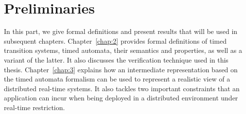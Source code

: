 \documentclass[a4paper,Times,twoside,index,12pt]{Classes/PhDThesisPSnPDF}
\begin{document}
\frontmatter




\begin{titlepage}
  \maketitle
\end{titlepage}

\mainmatter

%
%




\dominitoc
\dominilof
\dominilot
\renewcommand{\baselinestretch}{0.9}\normalsize
\tableofcontents
\renewcommand{\baselinestretch}{1.0}\normalsize


\adjustmtc



\part{Preliminaries}
{\label{part:1}
  In this part, we give formal definitions and present results that will be used in subsequent
chapters. Chapter~\ref{chap:2} provides formal definitions of timed transition systems,
timed automata, their semantics and properties, as well as a variant of the latter.
It also discusses the verification technique used in this thesis. Chapter~\ref{chap:3}
explains how an intermediate representation based on the timed automata formalism
can be used to represent a realistic view of a distributed real-time systems. It also tackles
two important constraints that an application can incur when being deployed in a distributed
environment under real-time restriction.} 
%
%
\end{document}
